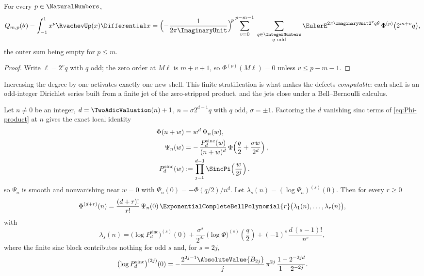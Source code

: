 \begin{proposition}
\label{prop:alias-layers}
For every $p\in\NaturalNumbers$,
\begin{equation}
 Q_{m,p}(\theta)-\int_{-1}^{1}x^{p}\RvachevUp(x)\Differential x
 =\Bigl(-\frac{1}{2\pi\ImaginaryUnit}\Bigr)^{\!p}
 \sum_{v=0}^{p-m-1}\;
 \sum_{\substack{q\in\IntegerNumbers\\ q\ \mathrm{odd}}}
 \EulerE^{2\pi\ImaginaryUnit2^{v}q\theta}\,
 \Phi^{(p)}\bigl(2^{m+v}q\bigr),
 \label{eq:alias-layers}
\end{equation}
the outer sum being empty for $p\le m$.
\end{proposition}

\begin{proof}
Write $\ell=2^{v}q$ with $q$ odd; the zero order at $M\ell$ is
$m+v+1$, so $\Phi^{(p)}(M\ell)=0$ unless $v\le p-m-1$.
\end{proof}

Increasing the degree by one activates exactly one new shell.  This
finite stratification is what makes the defects \emph{computable}: each
shell is an odd-integer Dirichlet series built from a finite jet of
the zero-stripped product, and the jets close under a Bell--Bernoulli
calculus.

\begin{proposition}
\label{prop:Bell-jets}
Let $n\ne0$ be an integer, $d=\TwoAdicValuation(n)+1$, $n=\sigma2^{d-1}q$ with $q$
odd, $\sigma=\pm1$.  Factoring the $d$ vanishing sinc terms of
\eqref{eq:Phi-product} at $n$ gives the exact local identity
\begin{equation}
 \begin{aligned}
 \Phi(n+w)&=w^{d}\,\Psi_n(w),\\
 \Psi_n(w)
 &=-\,\frac{P^{\mathrm{sinc}}_d(w)}{(n+w)^{d}}\,
   \Phi\!\left(\frac q2+\frac{\sigma w}{2^{d}}\right),\\
 P^{\mathrm{sinc}}_d(w)
 &:=\prod_{j=0}^{d-1}\SincPi\!\left(\frac{w}{2^{j}}\right).
 \end{aligned}
 \label{eq:local-factorization}
\end{equation}
so $\Psi_n$ is smooth and nonvanishing near $w=0$ with
$\Psi_n(0)=-\Phi(q/2)/n^{d}$.  Let
$\lambda_s(n)=(\log\Psi_n)^{(s)}(0)$.  Then for every $r\ge0$
\begin{equation}
 \Phi^{(d+r)}(n)
 =\frac{(d+r)!}{r!}\,\Psi_n(0)\,
 \ExponentialCompleteBellPolynomial{r}\bigl(\lambda_1(n),\dots,\lambda_r(n)\bigr),
 \label{eq:Bell-jets}
\end{equation}
with
\begin{equation}
 \lambda_s(n)
 =\bigl(\log P^{\mathrm{sinc}}_d\bigr)^{(s)}(0)
 +\frac{\sigma^{s}}{2^{ds}}\,
 \bigl(\log\Phi\bigr)^{(s)}\!\left(\frac q2\right)
 +(-1)^{s}\,\frac{d\,(s-1)!}{n^{s}},
 \label{eq:lambda-s}
\end{equation}
where the finite sinc block contributes nothing for odd $s$ and, for
$s=2j$,
\begin{equation}
 \bigl(\log P^{\mathrm{sinc}}_d\bigr)^{(2j)}(0)
 =-\frac{2^{2j-1}\AbsoluteValue{B_{2j}}}{j}\,\pi^{2j}\,
 \frac{1-2^{-2jd}}{1-2^{-2j}}.
 \label{eq:Bernoulli-log-jet}
\end{equation}
\end{proposition}

